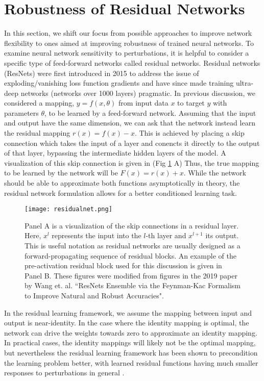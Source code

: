\documentclass[12pt]{article}
\begin{document}
\section{Robustness of Residual Networks}
\indent In this section, we shift our focus from possible approaches to improve network flexibility to ones aimed at improving robustness of trained neural networks. To examine neural network sensitivity to perturbations, it is helpful to consider a specific type of feed-forward networks called residual networks. Residual networks (ResNets) were first introduced in 2015 to address the issue of exploding/vanishing loss function gradients and have since made training ultra-deep networks (networks over 1000 layers) pragmatic. In previous discussion, we considered a mapping, $y = f(x,\theta)$ from input data $x$ to target $y$ with parameters $\theta$, to be learned by a feed-forward network. Assuming that the input and output have the same dimension, we can ask that the network instead learn the residual mapping $r(x) = f(x)-x$. This is achieved by placing a skip connection which takes the input of a layer and conencts it directly to the output of that layer, bypassing the intermediate hidden layers of the model. A visualization of this skip connection is given in (Fig \ref{fig:resnet} A) Thus, the true mapping to be learned by the network will be $F(x) = r(x) + x$. While the network should be able to approximate both functions asymptotically in theory, the residual network formulation allows for a better conditioned learning task. \\
\begin{figure}
  \centering
  \texttt{[image: residualnet.png]}
  \caption{Panel A is a visualization of the skip connections in a residual layer. Here, $x^l$ represents the input into the $l$-th layer and $x^{l+1}$ its output. This is useful notation as residual networks are usually designed as a forward-propagating sequence of residual blocks. An example of the pre-activation residual block used for this discussion is given in Panel B. These figures were modified from figures in the 2019 paper by Wang et. al. ``ResNets Ensemble via the Feynman-Kac Formalism to Improve Natural and Robust Accuracies"\cite{res}.}
  \label{fig:resnet}
\end{figure}
\indent In the residual learning framework, we assume the mapping between input and output is near-identity. In the case where the identity mapping is optimal, the network can drive the weights towards zero to approximate an identity mapping. In practical cases, the identity mappings will likely not be the optimal mapping, but nevertheless the residual learning framework has been shown to precondition the learning problem better, with learned residual functions having much smaller responses to perturbations in general \cite{res}.
\end{document}
